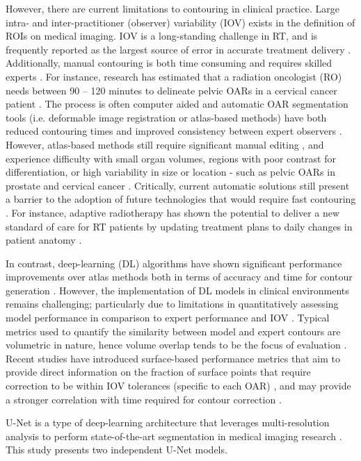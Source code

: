 However, there are current limitations to contouring in clinical practice. Large intra- and inter-practitioner (observer) variability (IOV) exists in the definition of ROIs on medical imaging. IOV is a long-standing challenge in RT, and is frequently reported as the largest source of error in accurate treatment delivery \cite{Vinod_2016, tg100}.
Additionally, manual contouring is both time consuming and requires skilled experts \cite{Nikolov_2018}. For instance, research has estimated that a radiation oncologist (RO) needs between 90 -- 120 minutes to delineate pelvic OARs in a cervical cancer patient \cite{Liu_2020}. The process is often computer aided and automatic OAR segmentation tools (i.e. deformable image registration or atlas-based methods) have both reduced contouring times and improved consistency between expert observers \cite{Vinod_2016}. However, atlas-based methods still require significant manual editing \cite{Nikolov_2018}, and experience difficulty with small organ volumes, regions with poor contrast for differentiation, or high variability in size or location - such as pelvic OARs in prostate and cervical cancer \cite{Schreier_2020, Liu_2020}. Critically, current automatic solutions still present a barrier to the adoption of future technologies that would require fast contouring \cite{Nikolov_2018}. For instance, adaptive radiotherapy has shown the potential to deliver a new standard of care for RT patients by updating treatment plans to daily changes in patient anatomy \cite{Nikolov_2018}. 

In contrast, deep-learning (DL) algorithms have shown significant performance improvements over atlas methods both in terms of accuracy and time for contour generation \cite{Liu_2020}. However, the implementation of DL models in clinical environments remains challenging; particularly due to limitations in quantitatively assessing model performance in comparison to expert performance and IOV \cite{Nikolov_2018}. Typical metrics used to quantify the similarity between model and expert contours are volumetric in nature, hence volume overlap tends to be the focus of evaluation \cite{Nikolov_2018}. Recent studies have introduced surface-based performance metrics that aim to provide direct information on the fraction of surface points that require correction to be within IOV tolerances (specific to each OAR) \cite{Nikolov_2018, Vaassen_2020}, and may provide a stronger correlation with time required for contour correction \cite{Vaassen_2020}.

U-Net is a type of deep-learning architecture that leverages multi-resolution analysis to perform state-of-the-art segmentation in medical imaging research \cite{Kazemifar_2018, Zhu_2018}. This study presents two independent U-Net models.

